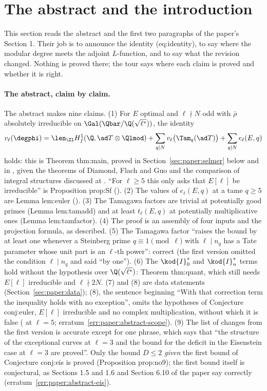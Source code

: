 \begin{sloppypar}
\section{The abstract and the introduction}\label{sec:paper:intro}

This section reads the abstract and the first two paragraphs of the paper's Section 1. Their job is to announce the identity (eq:identity), to say
where the modular degree meets the adjoint $L$-function, and to say what the revision changed. Nothing is proved there; the tour says where each
claim is proved and whether it is right.

\paragraph{The abstract, claim by claim.} The abstract makes nine claims. (1) For $E$ optimal and $\ell\nmid N$ odd with $\bar\rho$ absolutely irreducible
on $\Gal(\Qbar/\Q(\sqrt{\ell^*}))$, the identity
\[
v_\ell(\degphi)=\len_{\Zl}H^1_f(\Q,\ad T\otimes\Qlmod)+\sum_{q\mid N}v_\ell\bigl(\Tam_q(\ad T)\bigr)+\sum_{q\mid N}e_\ell(E,q)
\]
holds: this is Theorem thm:main, proved in Section~\ref{sec:paper:selmer} below and in , given the theorems of Diamond, Flach and Guo and
the comparison of integral structures discussed at . ``For $\ell\ge5$ this only asks that $E[\ell]$ be irreducible'' is
Proposition prop:Sf (). (2) The values of $e_\ell(E,q)$ at a tame $q\ge5$ are Lemma lem:euler (). (3) The Tamagawa factors
are trivial at potentially good primes (Lemma lem:tamadd) and at least $t_\ell(E,q)$ at potentially multiplicative ones (Lemma lem:tamfactor). (4) The
proof is an assembly of four inputs and the projection formula, as described. (5) The Tamagawa factor ``raises the bound by at least one whenever a
Steinberg prime $q\equiv1\pmod\ell$ with $\ell\mid n_q$ has a Tate parameter whose unit part is an $\ell$-th power'': correct (the first version omitted the
condition $\ell\mid n_q$ and said ``by one''). (6) The $\kod{I}_0^*$ and $\kod{I}_n^*$ terms hold without the hypothesis over $\Q(\sqrt{\ell^*})$: Theorem thm:quant,
which still needs $E[\ell]$ irreducible and $\ell\nmid2N$. (7) and (8) are data statements (Section~\ref{sec:paper:data}); (8), the sentence beginning ``With that correction
term the inequality holds with no exception'', omits the hypotheses of Conjecture conj:euler, $E[\ell]$ irreducible and no complex multiplication, without which it is false
( at $\ell=5$; erratum~\ref{err:paper:abstract-scope}). (9) The list of changes
from the first version is accurate except for one phrase, which says that ``the structure of the exceptional curves at $\ell=3$ and the bound for the
deficit in the Eisenstein case at $\ell=3$ are proved''. Only the bound $D\le2$ \emph{given} the first bound of Conjecture conj:eis is proved
(Proposition prop:no9); the first bound itself is conjectural, as Sections 1.5 and 1.6 and Section 6.10 of the paper say correctly (erratum~\ref{err:paper:abstract-eis}).


\end{sloppypar}
